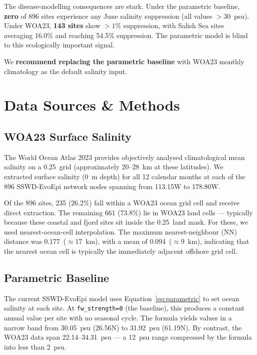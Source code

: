 \documentclass[11pt,a4paper]{article}
\begin{document}
The disease-modelling consequences are stark. Under the parametric baseline,
\textbf{zero} of 896 sites experience any June salinity suppression (all values
$>30$~psu). Under WOA23, \textbf{143 sites} show $>1\%$ suppression, with
Salish Sea sites averaging 16.0\% and reaching 54.5\% suppression. The parametric
model is blind to this ecologically important signal.

We \textbf{recommend replacing the parametric baseline} with WOA23 monthly
climatology as the default salinity input.

\section{Data Sources \& Methods}

\subsection{WOA23 Surface Salinity}

The World Ocean Atlas 2023 provides objectively analysed climatological mean
salinity on a 0.25\textdegree\ grid (approximately 20--28~km at these
latitudes). We extracted surface salinity (0~m depth) for all 12 calendar
months at each of the 896 SSWD-EvoEpi network nodes spanning from
113.15\textdegree W to 178.80\textdegree W.

Of the 896 sites, 235 (26.2\%) fall within a WOA23 ocean grid cell and receive
direct extraction. The remaining 661 (73.8\%) lie in WOA23 land cells ---
typically because these coastal and fjord sites sit inside the 0.25\textdegree\
land mask. For these, we used nearest-ocean-cell interpolation. The maximum
nearest-neighbour (NN) distance was 0.177\textdegree\ ($\approx$17~km), with a
mean of 0.094\textdegree\ ($\approx$9~km), indicating that the nearest ocean
cell is typically the immediately adjacent offshore grid cell.

\subsection{Parametric Baseline}

The current SSWD-EvoEpi model uses Equation~\ref{eq:parametric} to set ocean
salinity at each site. At \texttt{fw\_strength=0} (the baseline), this produces
a constant annual value per site with no seasonal cycle. The formula yields
values in a narrow band from 30.05~psu (26.56\textdegree N) to 31.92~psu
(61.19\textdegree N). By contrast, the WOA23 data span 22.14--34.31~psu ---
a 12~psu range compressed by the formula into less than 2~psu.
\end{document}
